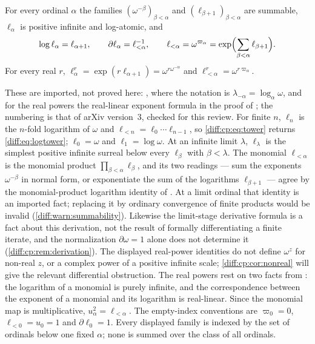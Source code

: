 \documentclass[11pt,letterpaper]{article}
\numberwithin{equation}{section}
\theoremstyle{definition}
\theoremstyle{remark}
\newcommand{\der}{\partial}
\begin{document}
\begin{proposition}
\label{diff:cp:prop:tower}
For every ordinal $\alpha$ the families $(\omega^{-\beta})_{\beta<\alpha}$ and
$(\ell_{\beta+1})_{\beta<\alpha}$ are summable, $\ell_{\alpha}$ is positive
infinite and log-atomic, and
\begin{equation}\label{diff:cp:eq:tower}
 \log\ell_{\alpha}=\ell_{\alpha+1},\qquad
 \der\ell_{\alpha}=\ell_{<\alpha}^{-1},\qquad
 \ell_{<\alpha}=\omega^{\varpi_{\alpha}}
 =\exp\Bigl(\sum_{\beta<\alpha}\ell_{\beta+1}\Bigr).
\end{equation}
For every real $r$,
$\ell_{\alpha}^{r}=\exp(r\ell_{\alpha+1})=\omega^{r\omega^{-\alpha}}$ and
$\ell_{<\alpha}^{r}=\omega^{r\varpi_{\alpha}}$.
\end{proposition}

These are imported, not proved here: \cite[Lemma~2.3, Proposition~2.5,
Lemmas~2.6--2.8 and the pre-derivation formula on p.~10]{ADH}, where the notation is
$\lambda_{-\alpha}=\log_{\alpha}\omega$, and for the real powers the
real-linear exponent formula in the proof of \cite[Lemma~2.3]{ADH}; the
numbering is that of arXiv version~3, checked for this review. For finite
$n$, $\ell_{n}$ is the $n$-fold logarithm of $\omega$ and
$\ell_{<n}=\ell_{0}\cdots\ell_{n-1}$, so \cref{diff:cp:eq:tower} returns
\cref{diff:eq:logtower}; $\ell_{0}=\omega$ and $\ell_{1}=\log\omega$. At an
infinite limit $\lambda$, $\ell_{\lambda}$ is the simplest positive infinite
surreal below every $\ell_{\beta}$ with $\beta<\lambda$. The monomial
$\ell_{<\alpha}$ is the monomial product $\prod_{\beta<\alpha}\ell_{\beta}$, and
its two readings --- sum the exponents $\omega^{-\beta}$ in normal form, or
exponentiate the sum of the logarithms $\ell_{\beta+1}$ --- agree by the
monomial-product logarithm identity of \cite[Lemma~2.3]{ADH}. At a limit
ordinal that identity is an imported fact; replacing it by ordinary
convergence of finite products would be invalid (\cref{diff:warn:summability}).
Likewise the limit-stage derivative formula is a fact about this derivation,
not the result of formally differentiating a finite iterate, and the
normalization $\der\omega=1$ alone does not determine it
(\cref{diff:cp:rem:derivation}). The displayed real-power identities do
not define $\omega^{z}$ for non-real $z$, or a complex power of a
positive infinite scale; \cref{diff:cp:cor:nonreal} will give the
relevant differential obstruction. The real powers rest on
two facts from \cite[Section~2]{ADH}: the logarithm of a
monomial is purely infinite, and the correspondence between the exponent of a
monomial and its logarithm is real-linear. Since the monomial map is
multiplicative, $u_{\alpha}^{2}=\ell_{<\alpha}$.
The empty-index conventions are
$\varpi_{0}=0$, $\ell_{<0}=u_{0}=1$ and $\der\ell_{0}=1$.
Every displayed family is indexed by the set of ordinals below one
fixed $\alpha$; none is summed over the class of all ordinals.
\end{document}
